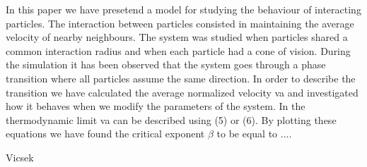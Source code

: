 \documentclass[twoside,twocolumn]{article}
\begin{document}
In this paper we have presetend a model for studying the behaviour of interacting particles. The interaction between particles consisted in maintaining the average velocity of nearby neighbours. The system was studied when particles shared a common interaction radius and when each particle had a cone of vision. During the simulation it has been observed that the system goes through a phase transition where all particles assume the same direction. In order to describe the transition we have calculated the average normalized velocity va and investigated how it behaves when we modify the parameters of the system. In the thermodynamic limit va can be described using (5) or (6).
By plotting these equations we have found  the critical exponent $\beta$ to be equal to ....



\begin{thebibliography}{99} %

  Vicsek
 
\end{thebibliography}

\end{document}
